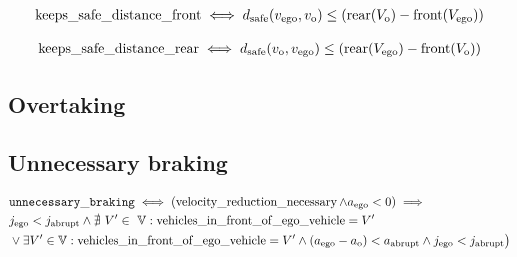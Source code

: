 \begin{align}
\operatorname*{keeps\_safe\_distance\_front} \iff d_\text{safe}(v_\text{ego}, v_\text{o}) \leq (\operatorname*{rear}(V_\text{o}) - \operatorname*{front}(V_\mathrm{ego}))
\end{align}

\begin{align}
\operatorname*{keeps\_safe\_distance\_rear} \iff d_\text{safe}(v_\text{o}, v_\text{ego}) \leq (\operatorname*{rear}(V_\text{ego}) - \operatorname*{front}(V_\text{o}))
\end{align}


\subsection{Overtaking}


\subsection{Unnecessary braking}
\begin{align}
\begin{split}
&\mathtt{unnecessary\_braking} \iff (\operatorname*{velocity\_reduction\_necessary} \land a_\text{ego} < 0) \implies\\
& j_\text{ego} < j_\text{abrupt} \land \nexists \ V' \in \ \mathbb{V} : \operatorname*{vehicles\_in\_front\_of\_ego\_vehicle} = V'  \\ 
& \lor \exists V' \in \mathbb{V} : \operatorname*{vehicles\_in\_front\_of\_ego\_vehicle} = V' \land (a_\text{ego} - a_\text{o}) <  a_\text{abrupt} \land j_\text{ego}  <  j_\text{abrupt} \big)
\end{split}
\end{align}
